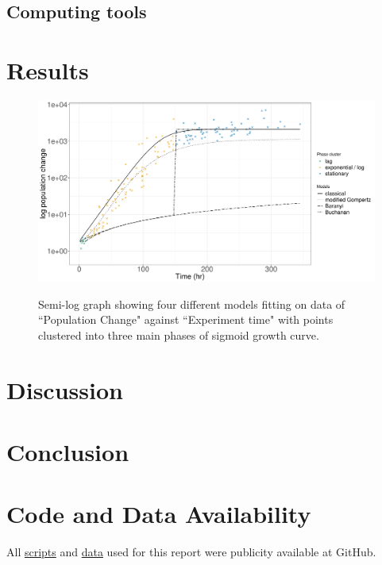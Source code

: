 \documentclass[a4paper, 11pt]{article}
\begin{document}
	\subsection*{Computing tools}
	\section*{Results}
	\begin{figure}[h]
		\centering\includegraphics[width=\linewidth]{Log_data.pdf}\label{semi-log}
		\caption{Semi-log graph showing four different models fitting on data of ``Population Change" against ``Experiment time" with points clustered into three main phases of sigmoid growth curve.}
	\end{figure}
	\section*{Discussion}
	\section*{Conclusion}
	\section*{Code and Data Availability}
	All \href{https://github.com/ph-u/CMEECourseWork_pmH/tree/master/MiniProject/code}{scripts} and \href{https://github.com/ph-u/CMEECourseWork_pmH/tree/master/MiniProject/data}{data} used for this report were publicity available at GitHub.
	\nocite{*}\printbibliography
\end{document}
